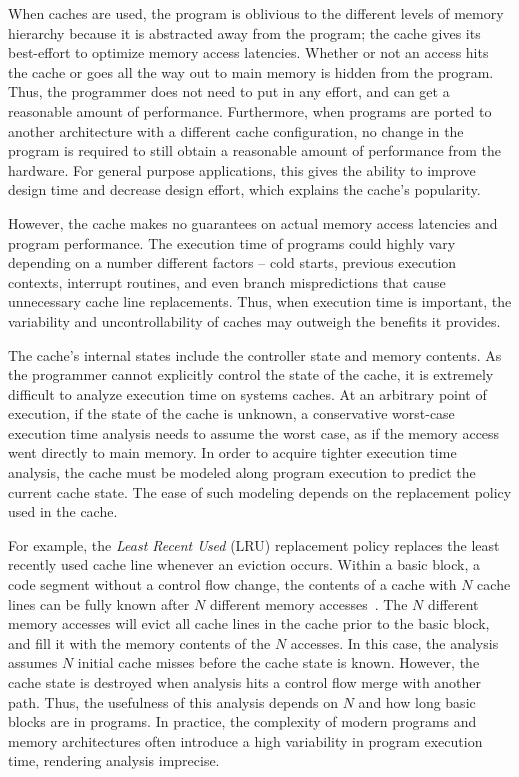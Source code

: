 When caches are used, the program is oblivious to the different levels of memory hierarchy because it is abstracted away from the program; the cache gives its best-effort to optimize memory access latencies.
Whether or not an access hits the cache or goes all the way out to main memory is hidden from the program.
Thus, the programmer does not need to put in any effort, and can get a reasonable amount of performance. 
Furthermore, when programs are ported to another architecture with a different cache configuration, no change in the program is required to still obtain a reasonable amount of performance from the hardware.   
For general purpose applications, this gives the ability to improve design time and decrease design effort, which explains the cache's popularity. 

However, the cache makes no guarantees on actual memory access latencies and program performance. 
The execution time of programs could highly vary depending on a number different factors -- cold starts, previous execution contexts, interrupt routines, and even branch mispredictions that cause unnecessary cache line replacements.  
Thus, when execution time is important, the variability and uncontrollability of caches may outweigh the benefits it provides. 

The cache's internal states include the controller state and memory contents. 
As the programmer cannot explicitly control the state of the cache, it is extremely difficult to analyze execution time on systems caches.
At an arbitrary point of execution, if the state of the cache is unknown, a conservative worst-case execution time analysis needs to assume the worst case, as if the memory access went directly to main memory.
In order to acquire tighter execution time analysis, the cache must be modeled along program execution to predict the current cache state.
The ease of such modeling depends on the replacement policy used in the cache.

For example, the \emph{Least Recent Used} (LRU) replacement policy replaces the least recently used cache line whenever an eviction occurs. 
Within a basic block, a code segment without a control flow change, the contents of a cache with $N$ cache lines can be fully known after $N$ different memory accesses~\cite{Heckmann2003processor}.  
The $N$ different memory accesses will evict all cache lines in the cache prior to the basic block, and fill it with the memory contents of the $N$ accesses. 
In this case, the analysis assumes $N$ initial cache misses before the cache state is known.
However, the cache state is destroyed when analysis hits a control flow merge with another path.
Thus, the usefulness of this analysis depends on $N$ and how long basic blocks are in programs.  
In practice, the complexity of modern programs and memory architectures often introduce a high variability in program execution time, rendering analysis imprecise. 

